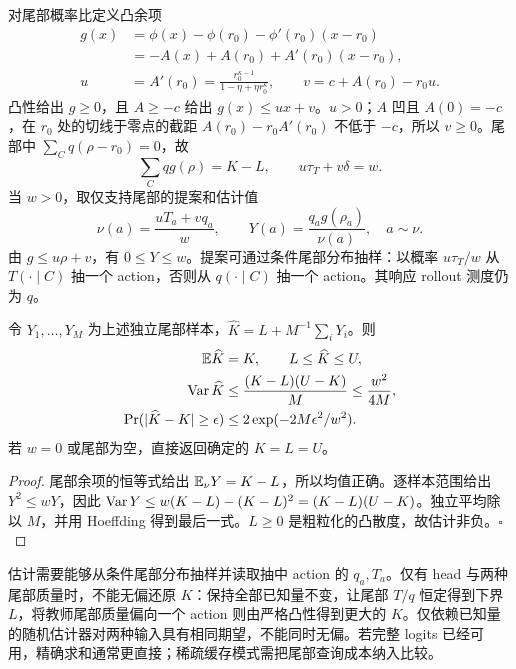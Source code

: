 对尾部概率比定义凸余项
\begin{align}
 g(x)&=\phi(x)-\phi(r_0)-\phi'(r_0)(x-r_0)\\
 &=-A(x)+A(r_0)+A'(r_0)(x-r_0),\\
 u&=A'(r_0)=\frac{r_0^{\kappa-1}}{1-\eta+\eta r_0^\kappa},\qquad
 v=c+A(r_0)-r_0u.
\end{align}
凸性给出 $g\ge0$，且 $A\ge-c$ 给出 $g(x)\le ux+v$。$u>0$；$A$ 凹且 $A(0)=-c$，在 $r_0$ 处的切线于零点的截距 $A(r_0)-r_0A'(r_0)$ 不低于 $-c$，所以 $v\ge0$。尾部中 $\sum_Cq(\rho-r_0)=0$，故
\begin{equation}
 \sum_Cqg(\rho)=K-L,\qquad u\tau_T+v\delta=w.
\end{equation}
当 $w>0$，取仅支持尾部的提案和估计值
\begin{equation}
 \nu(a)=\frac{uT_a+vq_a}{w},\qquad
 Y(a)=\frac{q_ag(\rho_a)}{\nu(a)},\quad a\sim\nu.
\end{equation}
由 $g\le u\rho+v$，有 $0\le Y\le w$。提案可通过条件尾部分布抽样：以概率 $u\tau_T/w$ 从 $T(\cdot\mid C)$ 抽一个 action，否则从 $q(\cdot\mid C)$ 抽一个 action。其响应 rollout 测度仍为 $q$。

\begin{theorem}[区间内的无偏教师中心估计]
\label{thm:center-tail-bounded-estimator}
令 $Y_1,\ldots,Y_M$ 为上述独立尾部样本，$\widehat K=L+M^{-1}\sum_iY_i$。则
\begin{align}
 \mathbb E\widehat K&=K,\qquad L\le\widehat K\le U,\\
 \operatorname{Var}\widehat K&\le\frac{(K-L)(U-K)}M\le\frac{w^2}{4M},\\
 \Pr(|\widehat K-K|\ge\epsilon)&\le2\exp(-2M\epsilon^2/w^2).
\end{align}
若 $w=0$ 或尾部为空，直接返回确定的 $K=L=U$。
\end{theorem}

\begin{proof}
尾部余项的恒等式给出 $\mathbb E_\nu Y=K-L$，所以均值正确。逐样本范围给出 $Y^2\le wY$，因此 $\operatorname{Var} Y\le w(K-L)-(K-L)^2=(K-L)(U-K)$。独立平均除以 $M$，并用 Hoeffding 得到最后一式。$L\ge0$ 是粗粒化的凸散度，故估计非负。\hfill$\square$
\end{proof}

估计需要能够从条件尾部分布抽样并读取抽中 action 的 $q_a,T_a$。仅有 head 与两种尾部质量时，不能无偏还原 $K$：保持全部已知量不变，让尾部 $T/q$ 恒定得到下界 $L$，将教师尾部质量偏向一个 action 则由严格凸性得到更大的 $K$。仅依赖已知量的随机估计器对两种输入具有相同期望，不能同时无偏。若完整 logits 已经可用，精确求和通常更直接；稀疏缓存模式需把尾部查询成本纳入比较。

